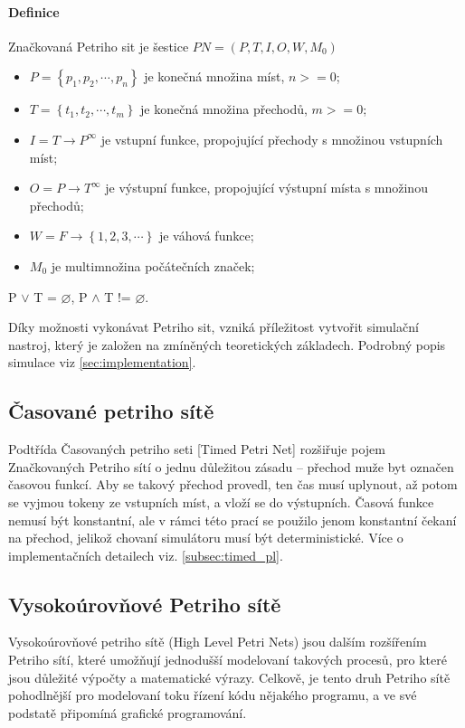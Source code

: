 \paragraph{Definice}

Značkovaná Petriho sit je šestice $PN = \left(P, T, I, O, W, M_0\right)$
\begin{itemize}
  \item $P = \left\{p_1, p_2, \cdots , p_n\right\}$ je konečná množina míst, $n >= 0$; \\
  \item $T = \left\{t_1, t_2, \cdots , t_m\right\}$ je konečná množina přechodů, $m >= 0$; \\
  \item $I = T \rightarrow P^\infty$ je vstupní funkce, propojující přechody s množinou vstupních míst; \\
  \item $O = P \rightarrow T^\infty$ je výstupní funkce, propojující výstupní místa s množinou přechodů; \\
  \item $W = F \rightarrow \left\{1, 2, 3, \cdots \right\}$ je váhová funkce; \\
  \item $M_0$ je multimnožina počátečních značek;
\end{itemize}
P $\vee$ T = $\varnothing$, P $\wedge$ T != $\varnothing$.

Díky možnosti vykonávat Petriho sit, vzniká příležitost vytvořit simulační nastroj, který je založen na zmíněných teoretických základech. Podrobný popis simulace viz \ref{sec:implementation}.

\subsection{Časované petriho sítě}
Podtřída Časovaných petriho seti [Timed Petri Net] rozšiřuje pojem Značkovaných Petriho sítí o jednu důležitou zásadu -- přechod muže byt označen časovou funkcí. Aby se takový přechod provedl, ten čas musí uplynout, až potom se vyjmou tokeny ze vstupních míst, a vloží se do výstupních. Časová funkce nemusí být konstantní, ale v rámci této prací se použilo jenom konstantní čekaní na přechod, jelikož chovaní simulátoru musí být deterministické. Více o implementačních detailech viz. \ref{subsec:timed_pl}.

\subsection{Vysokoúrovňové Petriho sítě}
Vysokoúrovňové petriho sítě (High Level Petri Nets) jsou dalším rozšířením Petriho sítí, které umožňují jednodušší modelovaní takových procesů, pro které jsou důležité výpočty a matematické výrazy. Celkově, je tento druh Petriho sítě pohodlnější pro modelovaní toku řízení kódu nějakého programu, a ve své podstatě připomíná grafické programování.

